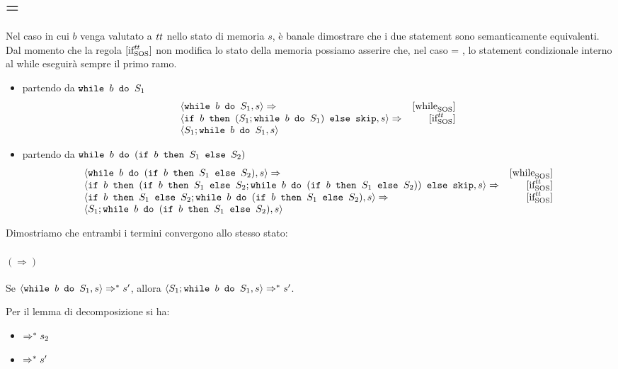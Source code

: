 \subsection{ = \semtrue}

Nel caso in cui $b$ venga valutato a $\semtrue$ nello stato di memoria $s$, è
banale dimostrare che i due statement sono semanticamente equivalenti. Dal 
momento che la regola $\ifttSOS{}$ non modifica lo stato della memoria
possiamo asserire che, nel caso  = \semtrue, lo 
statement condizionale interno al while eseguirà sempre il primo ramo.

\begin{itemize}
  \item partendo da $\wbS{b}{S_1}$
  $$
\begin{array}{lr}
\confSs{\wbS{b}{S_1}}{s} \Rar{} &
\whileSOS \\
\confSs{\ifABC{b}{(S_1;\wbS{b}{S_1})}{\skipForFriends}}{s} \Rar{} &
\ifttSOS \\
\confSs{S_1;\wbS{b}{S_1}}{s} &
\end{array}
  $$
  \item partendo da $\wbS{b}{(\ifABC{b}{S_1}{S_2})}$
  $$
\begin{array}{lr}
\confSs{\wbS{b}{(\ifABC{b}{S_1}{S_2})}}{s} \Rar{} &
\whileSOS \\
\confSs{\ifABC{b}
              {(\ifABC{b}{S_1}{S_2}; \wbS{b}{(\ifABC{b}{S_1}{S_2})})}
              {\skipForFriends}}
       {s} \Rar{} &
\ifttSOS \\
\confSs{\ifABC{b}{S_1}{S_2}; \wbS{b}{(\ifABC{b}{S_1}{S_2})}}
       {s} \Rar{} &
\ifttSOS \\
\confSs{S_1; \wbS{b}{(\ifABC{b}{S_1}{S_2})}}{s}
\end{array}
  $$
\end{itemize}

Dimostriamo che entrambi i termini convergono allo stesso
stato:

\paragraph{$(\Rightarrow)$}

Se $\confSs{\wbS{b}{S_1}}{s} \Rar{*} s'$, allora
$\confSs{S_1;\wbS{b}{S_1}}{s} \Rar{*} s'$.

Per il lemma di decomposizione si ha:
\begin{itemize}
  \item {} $\Rar{*} s_2$
  \item {} $\Rar{*} s'$
\end{itemize}

